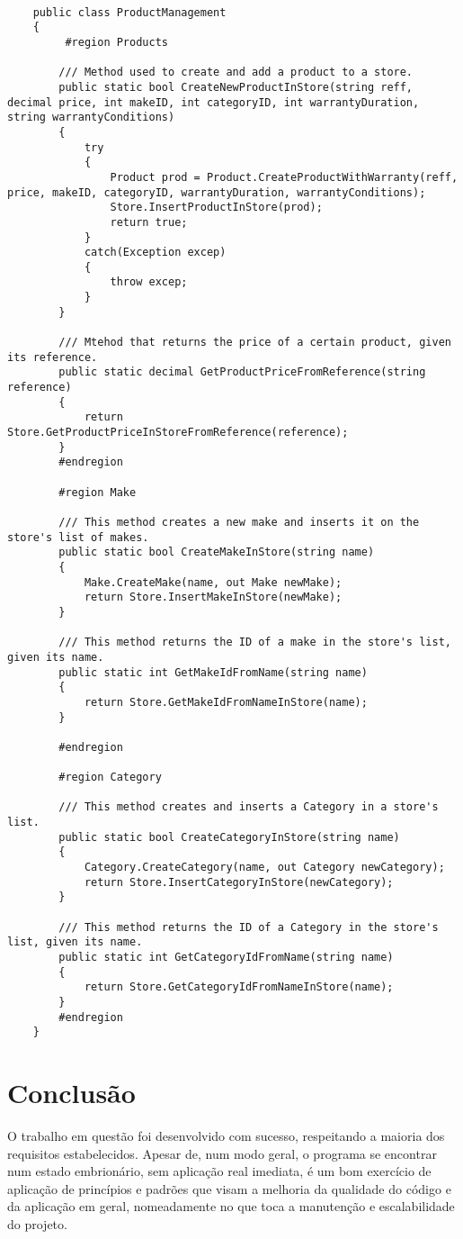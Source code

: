 \documentclass[11pt]{scrartcl} %
\begin{document}
\vspace{15px}
\begin{lstlisting}[language={[Sharp]C}, caption={Classe ProductManagement.cs}, label={Classe ProductManagement.cs}]
	
	public class ProductManagement
	{
		 #region Products
		 
		/// Method used to create and add a product to a store.
		public static bool CreateNewProductInStore(string reff, decimal price, int makeID, int categoryID, int warrantyDuration, string warrantyConditions)
		{
			try
			{
				Product prod = Product.CreateProductWithWarranty(reff, price, makeID, categoryID, warrantyDuration, warrantyConditions);
				Store.InsertProductInStore(prod);
				return true;
			}
			catch(Exception excep)
			{
				throw excep;
			}
		}
		
		/// Mtehod that returns the price of a certain product, given its reference.
		public static decimal GetProductPriceFromReference(string reference)
		{
			return Store.GetProductPriceInStoreFromReference(reference);
		}
		#endregion
		
		#region Make

		/// This method creates a new make and inserts it on the store's list of makes.
		public static bool CreateMakeInStore(string name)
		{
			Make.CreateMake(name, out Make newMake);
			return Store.InsertMakeInStore(newMake);
		}
		
		/// This method returns the ID of a make in the store's list, given its name.
		public static int GetMakeIdFromName(string name)
		{
			return Store.GetMakeIdFromNameInStore(name);
		}
		
		#endregion
		
		#region Category

		/// This method creates and inserts a Category in a store's list.
		public static bool CreateCategoryInStore(string name)
		{
			Category.CreateCategory(name, out Category newCategory);
			return Store.InsertCategoryInStore(newCategory);
		}
		
		/// This method returns the ID of a Category in the store's list, given its name.
		public static int GetCategoryIdFromName(string name)
		{
			return Store.GetCategoryIdFromNameInStore(name);
		}
		#endregion
	}
\end{lstlisting}

\section{Conclusão}
O trabalho em questão foi desenvolvido com sucesso, respeitando a maioria dos requisitos estabelecidos. Apesar de, num modo geral, o programa se encontrar num estado embrionário, sem aplicação real imediata, é um bom exercício de aplicação de princípios e padrões que visam a melhoria da qualidade do código e da aplicação em geral, nomeadamente no que toca a manutenção e escalabilidade do projeto.
\end{document}
